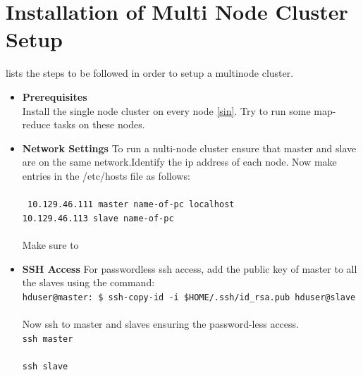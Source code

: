 \documentclass[12pt]{book}
\newcommand{\shellcmd}[1]{\\\indent\texttt{\footnotesize #1}\\}
\begin{document}
\section{Installation of Multi Node Cluster Setup}
\cite{multi} lists the steps to be followed in order to setup a multinode cluster.
\begin{itemize}
\item \textbf{Prerequisites}\\
Install the single node cluster on every node \ref{sin}.
Try to run some map-reduce tasks on these nodes.
\item \textbf{Network Settings}
To run a nulti-node cluster ensure that master and slave are on the same network.Identify the ip address of each node.
Now make entries in the /etc/hosts file as follows:\\
\shellcmd{
  10.129.46.111 master name-of-pc localhost\\
  10.129.46.113 slave  name-of-pc\\
}
Make sure to 
\item \textbf{SSH Access}
For passwordless ssh access, add the public key of master to all the slaves using the command:
\shellcmd{hduser@master:~\$ ssh-copy-id -i \$HOME/.ssh/id\_rsa.pub hduser@slave}\\
Now ssh to master and slaves ensuring the password-less access.
\shellcmd{ssh master}
\shellcmd{ssh slave}


\end{itemize}
\end{document}
